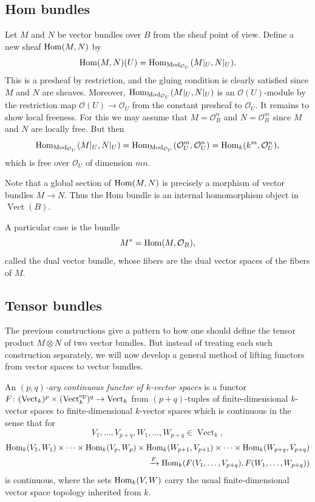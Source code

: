 \documentclass[a4paper,openany]{scrbook}
\DeclareMathOperator{\Vect}{Vect}
\begin{document}
\subsection{Hom bundles}

Let $M$ and $N$ be vector bundles over $B$ from the sheaf point of view. Define a new sheaf $\operatorname{Hom}(M,N)$ by
\[
\operatorname{Hom}(M,N)(U) = \operatorname{Hom}_{\operatorname{Mod}_{\mathcal O_U}}(M|_U,N|_U).
\]
This is a presheaf by restriction, and the gluing condition is clearly satisfied since $M$ and $N$ are sheaves. Moreover, $\operatorname{Hom}_{\operatorname{Mod}_{\mathcal O_U}}(M|_U,N|_U)$ is an $\mathcal O(U)$-module by the restriction map $\mathcal O(U) \to \mathcal O_U$ from the constant presheaf to $\mathcal O_U$. It remains to show local freeness. For this we may assume that $M = \mathcal O_B^n$ and $N = \mathcal O_B^m$ since $M$ and $N$ are locally free. But then
\[
\operatorname{Hom}_{\operatorname{Mod}_{\mathcal O_U}}(M|_U,N|_U) = \operatorname{Hom}_{\operatorname{Mod}_{\mathcal O_U}}(\mathcal O_U^m,\mathcal O_U^n) = \operatorname{Hom}_k(k^m,\mathcal O_U^n),
\]
which is free over $\mathcal O_U$ of dimension $mn$.

Note that a global section of $\operatorname{Hom}(M,N)$ is precisely a morphism of vector bundles $M \to N$. Thus the Hom bundle is an internal homomorphism object in $\Vect(B)$.

A particular case is the bundle
\[
M^* = \operatorname{Hom}(M,\mathcal O_B),
\]
called the dual vector bundle, whose fibers are the dual vector spaces of the fibers of $M$.

\subsection{Tensor bundles}

The previous constructions give a pattern to how one should define the tensor product $M \otimes N$ of two vector bundles. But instead of treating each such construction separately, we will now develop a general method of lifting functors from vector spaces to vector bundles.

\begin{defn}
An \emph{$(p,q)$-ary continuous functor of $k$-vector spaces} is a functor $F\colon (\Vect_k)^p \times (\Vect_k^\op)^q \to \Vect_k$ from $(p+q)$-tuples of finite-dimensional $k$-vector spaces to finite-dimensional $k$-vector spaces which is continuous in the sense that for
\[
V_1,\dots,V_{p+q}, W_1,\dots,W_{p+q} \in \Vect_k,
\]
\begin{align*}
\operatorname{Hom}_k(V_1,W_1) \times \cdots \times \operatorname{Hom}_k(V_{p},W_{p}) \times \operatorname{Hom}_k(W_{p+1},V_{p+1}) \times \cdots \times \operatorname{Hom}_k(W_{p+q},V_{p+q}) \\
\xrightarrow{F} \operatorname{Hom}_k(F(V_1,\dots,V_{p+q}),F(W_1,\dots,W_{p+q}))
\end{align*}
is continuous, where the sets $\operatorname{Hom}_k(V,W)$ carry the usual finite-dimensional vector space topology inherited from $k$.
\end{defn} 
\end{document}
